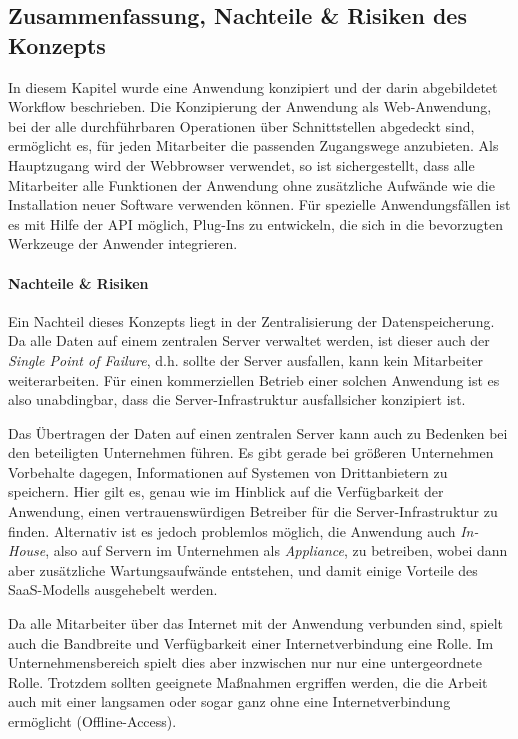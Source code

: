 \subsection{Zusammenfassung, Nachteile \& Risiken des Konzepts}

In diesem Kapitel wurde eine Anwendung konzipiert und der darin abgebildetet Workflow beschrieben. Die Konzipierung der Anwendung als Web-Anwendung, bei der alle durchführbaren Operationen über Schnittstellen abgedeckt sind, ermöglicht es, für jeden Mitarbeiter die passenden Zugangswege anzubieten. Als Hauptzugang wird der Webbrowser verwendet, so ist sichergestellt, dass alle Mitarbeiter alle Funktionen der Anwendung ohne zusätzliche Aufwände wie die Installation neuer Software verwenden können. Für spezielle Anwendungsfällen ist es mit Hilfe der API möglich, Plug-Ins zu entwickeln, die sich in die bevorzugten Werkzeuge der Anwender integrieren.

\paragraph{Nachteile \& Risiken} Ein Nachteil dieses Konzepts liegt in der Zentralisierung der Datenspeicherung. Da alle Daten auf einem zentralen Server verwaltet werden, ist dieser auch der \emph{Single Point of Failure}, d.h. sollte der Server ausfallen, kann kein Mitarbeiter weiterarbeiten. Für einen kommerziellen Betrieb einer solchen Anwendung ist es also unabdingbar, dass die Server-Infrastruktur ausfallsicher konzipiert ist. 

Das Übertragen der Daten auf einen zentralen Server kann auch zu Bedenken bei den beteiligten Unternehmen führen. Es gibt gerade bei größeren Unternehmen Vorbehalte dagegen, Informationen auf Systemen von Drittanbietern zu speichern. Hier gilt es, genau wie im Hinblick auf die Verfügbarkeit der Anwendung, einen vertrauenswürdigen Betreiber für die Server-Infrastruktur zu finden. Alternativ ist es jedoch problemlos möglich, die Anwendung auch \emph{In-House}, also auf Servern im Unternehmen als \emph{Appliance}, zu betreiben, wobei dann aber zusätzliche Wartungsaufwände entstehen, und damit einige Vorteile des SaaS-Modells ausgehebelt werden. 

Da alle Mitarbeiter über das Internet mit der Anwendung verbunden sind, spielt auch die Bandbreite und Verfügbarkeit einer Internetverbindung eine Rolle. Im Unternehmensbereich spielt dies aber inzwischen nur nur eine untergeordnete Rolle. Trotzdem sollten geeignete Maßnahmen ergriffen werden, die die Arbeit auch mit einer langsamen oder sogar ganz ohne eine Internetverbindung ermöglicht (Offline-Access).

